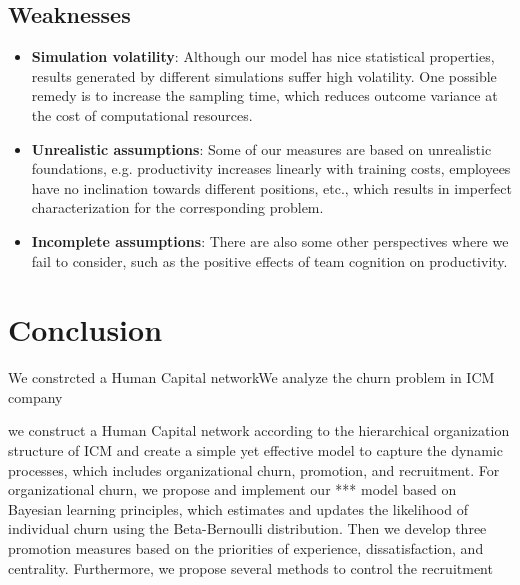 \documentclass[tcn = 37075, sheet = false, abstract = false]{mcmthesis}
\begin{document}
\subsection{Weaknesses}
\begin{itemize}
\item \textbf{Simulation volatility}: Although our model has nice statistical properties, results generated by different simulations suffer high volatility. One possible remedy is to increase the sampling time, which reduces outcome variance at the cost of computational resources.

\item \textbf{Unrealistic assumptions}: Some of our measures are based on unrealistic foundations, e.g. productivity increases linearly with training costs, employees have no inclination towards different positions, etc., which results in imperfect characterization for the corresponding problem.

\item \textbf{Incomplete assumptions}: There are also some other perspectives where we fail to consider, such as the positive effects of team cognition on productivity. 
\end{itemize}


\section{Conclusion}

We constrcted a Human Capital networkWe analyze the churn problem in ICM company 

we construct a Human Capital network according to the hierarchical organization structure of ICM and create a simple yet effective model to capture the dynamic processes, which includes organizational churn, promotion, and recruitment. For organizational churn, we propose and implement our *** model based on Bayesian learning principles, which estimates and updates the likelihood of individual churn using the Beta-Bernoulli distribution. Then we develop three promotion measures based on the priorities of experience, dissatisfaction, and centrality. Furthermore, we propose several methods to control the recruitment 



\end{document}
